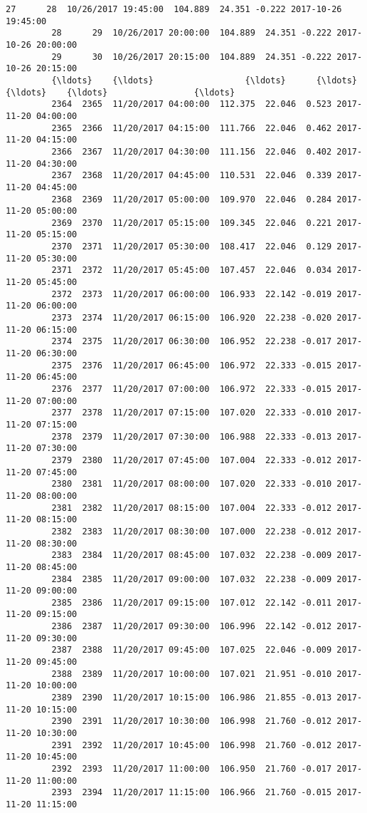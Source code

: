 \documentclass[11pt]{article}
\begin{document}
\begin{Verbatim}[commandchars=\\\{\}]
         27      28  10/26/2017 19:45:00  104.889  24.351 -0.222 2017-10-26 19:45:00   
         28      29  10/26/2017 20:00:00  104.889  24.351 -0.222 2017-10-26 20:00:00   
         29      30  10/26/2017 20:15:00  104.889  24.351 -0.222 2017-10-26 20:15:00   
         {\ldots}    {\ldots}                  {\ldots}      {\ldots}     {\ldots}    {\ldots}                 {\ldots}   
         2364  2365  11/20/2017 04:00:00  112.375  22.046  0.523 2017-11-20 04:00:00   
         2365  2366  11/20/2017 04:15:00  111.766  22.046  0.462 2017-11-20 04:15:00   
         2366  2367  11/20/2017 04:30:00  111.156  22.046  0.402 2017-11-20 04:30:00   
         2367  2368  11/20/2017 04:45:00  110.531  22.046  0.339 2017-11-20 04:45:00   
         2368  2369  11/20/2017 05:00:00  109.970  22.046  0.284 2017-11-20 05:00:00   
         2369  2370  11/20/2017 05:15:00  109.345  22.046  0.221 2017-11-20 05:15:00   
         2370  2371  11/20/2017 05:30:00  108.417  22.046  0.129 2017-11-20 05:30:00   
         2371  2372  11/20/2017 05:45:00  107.457  22.046  0.034 2017-11-20 05:45:00   
         2372  2373  11/20/2017 06:00:00  106.933  22.142 -0.019 2017-11-20 06:00:00   
         2373  2374  11/20/2017 06:15:00  106.920  22.238 -0.020 2017-11-20 06:15:00   
         2374  2375  11/20/2017 06:30:00  106.952  22.238 -0.017 2017-11-20 06:30:00   
         2375  2376  11/20/2017 06:45:00  106.972  22.333 -0.015 2017-11-20 06:45:00   
         2376  2377  11/20/2017 07:00:00  106.972  22.333 -0.015 2017-11-20 07:00:00   
         2377  2378  11/20/2017 07:15:00  107.020  22.333 -0.010 2017-11-20 07:15:00   
         2378  2379  11/20/2017 07:30:00  106.988  22.333 -0.013 2017-11-20 07:30:00   
         2379  2380  11/20/2017 07:45:00  107.004  22.333 -0.012 2017-11-20 07:45:00   
         2380  2381  11/20/2017 08:00:00  107.020  22.333 -0.010 2017-11-20 08:00:00   
         2381  2382  11/20/2017 08:15:00  107.004  22.333 -0.012 2017-11-20 08:15:00   
         2382  2383  11/20/2017 08:30:00  107.000  22.238 -0.012 2017-11-20 08:30:00   
         2383  2384  11/20/2017 08:45:00  107.032  22.238 -0.009 2017-11-20 08:45:00   
         2384  2385  11/20/2017 09:00:00  107.032  22.238 -0.009 2017-11-20 09:00:00   
         2385  2386  11/20/2017 09:15:00  107.012  22.142 -0.011 2017-11-20 09:15:00   
         2386  2387  11/20/2017 09:30:00  106.996  22.142 -0.012 2017-11-20 09:30:00   
         2387  2388  11/20/2017 09:45:00  107.025  22.046 -0.009 2017-11-20 09:45:00   
         2388  2389  11/20/2017 10:00:00  107.021  21.951 -0.010 2017-11-20 10:00:00   
         2389  2390  11/20/2017 10:15:00  106.986  21.855 -0.013 2017-11-20 10:15:00   
         2390  2391  11/20/2017 10:30:00  106.998  21.760 -0.012 2017-11-20 10:30:00   
         2391  2392  11/20/2017 10:45:00  106.998  21.760 -0.012 2017-11-20 10:45:00   
         2392  2393  11/20/2017 11:00:00  106.950  21.760 -0.017 2017-11-20 11:00:00   
         2393  2394  11/20/2017 11:15:00  106.966  21.760 -0.015 2017-11-20 11:15:00   
         

\end{Verbatim}
\end{document}
